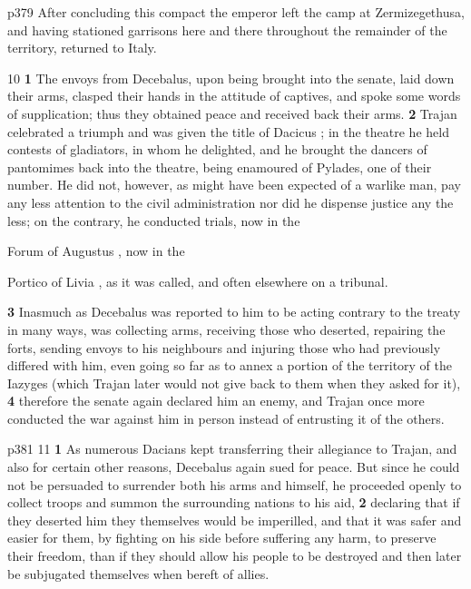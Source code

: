 p379 After concluding this compact the emperor left the camp at Zermizegethusa, and having stationed garrisons here and there throughout the remainder of the territory, returned to Italy.

10
\textbf{1} The envoys from Decebalus, upon being brought into the senate, laid down their arms, clasped their hands in the attitude of captives, and spoke some words of supplication; thus they obtained peace and received back their arms. \textbf{2} Trajan celebrated a triumph and was given the title of Dacicus ; in the theatre he held contests of gladiators, in whom he delighted, and he brought the dancers of pantomimes back into the theatre, being enamoured of Pylades, one of their number. He did not, however, as might have been expected of a warlike man, pay any less attention to the civil administration nor did he dispense justice any the less; on the contrary, he conducted trials, now in the

Forum of Augustus , now in the

Portico of Livia , as it was called, and often elsewhere on a tribunal.

\textbf{3} Inasmuch as Decebalus was reported to him to be acting contrary to the treaty in many ways, was collecting arms, receiving those who deserted, repairing the forts, sending envoys to his neighbours and injuring those who had previously differed with him, even going so far as to annex a portion of the territory of the Iazyges (which Trajan later would not give back to them when they asked for it), \textbf{4} therefore the senate again declared him an enemy, and Trajan once more conducted the war against him in person instead of entrusting it of the others.

p381
11
\textbf{1} As numerous Dacians kept transferring their allegiance to Trajan, and also for certain other reasons, Decebalus again sued for peace. But since he could not be persuaded to surrender both his arms and himself, he proceeded openly to collect troops and summon the surrounding nations to his aid, \textbf{2} declaring that if they deserted him they themselves would be imperilled, and that it was safer and easier for them, by fighting on his side before suffering any harm, to preserve their freedom, than if they should allow his people to be destroyed and then later be subjugated themselves when bereft of allies.

